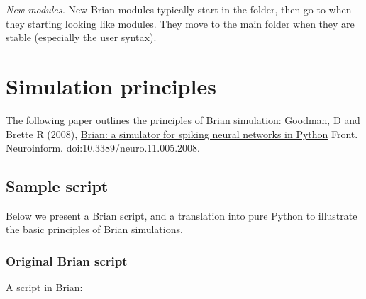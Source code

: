 \documentclass[letterpaper,10pt,english]{manual}
\begin{document}
\emph{New modules.}
New Brian modules typically start in the  folder, then go to 
when they starting looking like modules. They move to the main folder when they are
stable (especially the user syntax).

\resetcurrentobjects
\hypertarget{--doc-developer-simulationprinciples}{}

\section{Simulation principles}

The following paper outlines the principles of Brian simulation: Goodman, D and
Brette R (2008),
\href{http://www.frontiersin.org/neuroinformatics/paper/10.3389/neuro.11/005.2008/}{Brian: a simulator for spiking neural networks in Python}
Front. Neuroinform. doi:10.3389/neuro.11.005.2008.


\subsection{Sample script}

Below we present a Brian script, and a translation into pure Python to
illustrate the basic principles of Brian simulations.


\subsubsection{Original Brian script}

A script in Brian:
\end{document}
